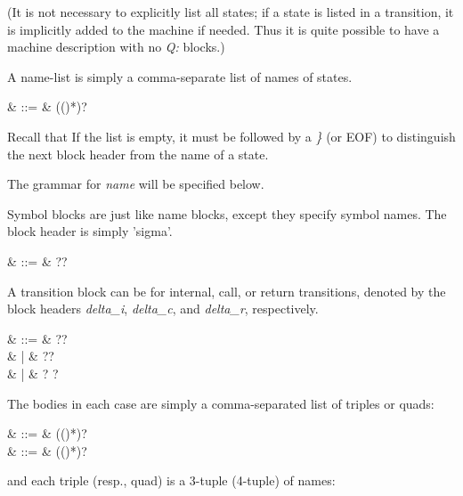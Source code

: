 (It is not necessary to explicitly list all states; if a state is
listed in a transition, it is implicitly added to the machine if
needed. Thus it is quite possible to have a machine description with
no \textsl{Q:} blocks.)

A name-list is simply a comma-separate list of names of states.

\begin{grammar}
   & ::= & (\cfgsp (\term{,}\cfgsp  {})*)?
\end{grammar}

Recall that If the list is empty, it must be followed by a \textsl{\}}
(or EOF) to distinguish the next block header from the name of a
state.

The grammar for \textsl{name} will be specified below.


Symbol blocks are just like name blocks, except they specify symbol
names. The block header is simply 'sigma'.

\begin{grammar}
   & ::= & \cfgsp  \term{\{}?\cfgsp  {}\cfgsp  \term{\}}?
\end{grammar}

A transition block can be for internal, call, or return transitions,
denoted by the block headers \textsl{delta\_i}, \textsl{delta\_c}, and
\textsl{delta\_r}, respectively.
 
\begin{grammar}
   & ::= & \cfgsp  \term{\{}?\cfgsp  {}\cfgsp  \term{\}}? \\
                        &   | & \cfgsp  \term{\{}?\cfgsp  {}\cfgsp  \term{\}}? \\
                        &   | & \cfgsp  \term{\{}?\cfgsp  {}  \cfgsp  \term{\}}?
\end{grammar}

The bodies in each case are simply a comma-separated list of triples
or quads:

\begin{grammar}
   & ::= & (\cfgsp  (\term{,}\cfgsp  {})*)? \\
     & ::= & (\cfgsp  (\term{,}\cfgsp  {})*)?
\end{grammar}

and each triple (resp., quad) is a 3-tuple (4-tuple) of names:

